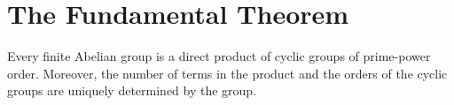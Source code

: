 \section{The Fundamental Theorem}

\begin{theorem}
	Every finite Abelian group is a direct product of cyclic groups of prime-power order. Moreover, the number of terms in the product and the orders of the cyclic groups are uniquely determined by the group.
\end{theorem}
